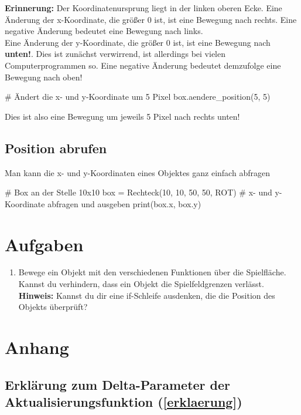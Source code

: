\documentclass{\VorlagenPfad/coderdojokatext}
\begin{document}
\begin{merkbox}
\textbf{Erinnerung:} Der Koordinatenursprung  liegt in der linken oberen Ecke.
Eine Änderung der x-Koordinate, die größer 0 ist, ist eine Bewegung nach rechts. Eine negative Änderung bedeutet eine Bewegung nach links.	
\\
Eine Änderung der y-Koordinate, die größer 0 ist, ist eine Bewegung nach \textbf{unten!}. Dies ist zunächst verwirrend, ist allerdings bei vielen Computerprogrammen so. Eine negative Änderung bedeutet demzufolge eine Bewegung nach oben!	
\begin{pythoncode}
# Ändert die x- und y-Koordinate um 5 Pixel
box.aendere_position(5, 5)
\end{pythoncode}
Dies ist also eine Bewegung um jeweils 5 Pixel nach rechts unten!
\end{merkbox}

\subsection{Position abrufen}
Man kann die x- und y-Koordinaten eines Objektes ganz einfach abfragen
\begin{pythoncode}
# Box an der Stelle 10x10
box = Rechteck(10, 10, 50, 50, ROT)
# x- und y-Koordinate abfragen und ausgeben
print(box.x, box.y)
\end{pythoncode}

\section{Aufgaben}
\begin{enumerate}
\item Bewege ein Objekt mit den verschiedenen Funktionen über die Spielfläche. 
Kannst du verhindern, dass ein Objekt die Spielfeldgrenzen verlässt.
\\
\textbf{Hinweis:} Kannst du dir eine if-Schleife ausdenken, die die Position des Objekts überprüft?
\end{enumerate}
\clearpage
\section{Anhang}
\subsection{Erklärung zum Delta-Parameter der Aktualisierungsfunktion (\ref{erklaerung})}
\end{document}
